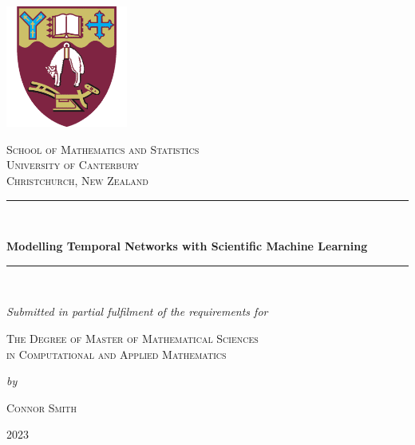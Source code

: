 \documentclass[12pt]{amsbook}
\begin{document}
\begin{titlepage}
    \begin{center}
        \includegraphics[width=0.3\textwidth]{uc-logo.png}\\
        \vspace{0.5cm}
        \begin{large}
        \textsc{School of Mathematics and Statistics\\ University of Canterbury \\
        Christchurch, New Zealand}\\
        \end{large}
        \vspace{0.2cm}
        \noindent\rule{\textwidth}{0.4pt}\\
        \begin{LARGE}
        \textbf{Modelling Temporal Networks with Scientific Machine Learning}\\
        \noindent\rule{\textwidth}{0.4pt}
        \end{LARGE}\\
        \vspace{0.2cm}
        \begin{large} 
        \textit{Submitted in partial fulfilment of the requirements for}\\
        \end{large}
        \begin{Large}
        \vspace{0.2cm}
        \textsc{The Degree of Master of Mathematical Sciences \\ in Computational and Applied Mathematics}\\
        \end{Large}
        \begin{large}
        \textit{by}\\
        \end{large}
        \begin{Large}
        \textsc{Connor Smith}\\
        \end{Large}
        \vfill
        \begin{large}
        \vspace{0.2cm}
        2023
        \end{large}
    \end{center}
\end{titlepage}
\end{document}
